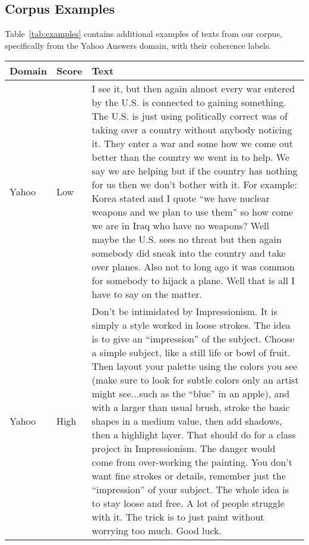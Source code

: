 \documentclass[11pt,a4paper]{article}
\begin{document}
\subsection{Corpus Examples}

Table~\ref{tab:examples} contains additional examples of texts from our corpus, specifically from the Yahoo Answers domain, with their coherence labels.
 
\begin{table*}[htb]
\begin{center}
\begin{footnotesize}
\begin{tabular}{@{}l@{\hspace{1em}}l@{\hspace{1em}}p{13.5cm}@{}}
\toprule
Domain & Score & Text \\
\midrule
Yahoo & Low & I see it, but then again almost every war entered by the U.S. is connected to gaining something. The U.S. is just using politically correct was of taking over a country without anybody noticing it. They enter a war and some how we come out better than the country we went in to help. We say we are helping but if the country has nothing for us then we don't bother with it. For example: Korea stated and I quote ``we have nuclear weapons and we plan to use them'' so how come we are in Iraq who have no weapons? Well maybe the U.S. sees no threat but then again somebody did sneak into the country and take over planes. Also not to long ago it was common for somebody to hijack a plane. Well that is all I have to say on the matter.\\
Yahoo & High & Don't be intimidated by Impressionism.  It is simply a style worked in loose strokes.  The idea is to give an ``impression'' of the subject.  Choose a simple subject, like a still life or bowl of fruit.  Then layout your palette using the colors you see (make sure to look for subtle colors only an artist might see...such as the ``blue'' in an apple), and with a larger than usual brush, stroke the basic shapes in a medium value, then add shadows, then a highlight layer.  That should do for a class project in Impressionism.  The danger would come from over-working the painting.  You don't want fine strokes or details, remember just the ``impression'' of your subject.  The whole idea is to stay loose and free.  A lot of people struggle with it.  The trick is to just paint without worrying too much.  Good luck.\\
\bottomrule
\end{tabular}
\caption{Examples of texts with coherence scores.}
\label{tab:examples}
\end{footnotesize}
\end{center}
\end{table*}
\end{document}
